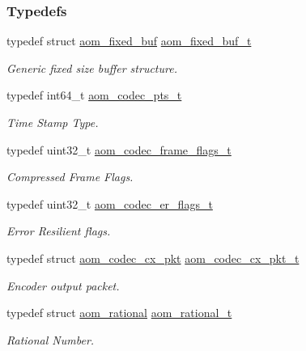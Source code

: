\subsubsection*{Typedefs}
\begin{DoxyCompactItemize}
\item 
typedef struct \hyperlink{structaom__fixed__buf}{aom\+\_\+fixed\+\_\+buf} \hyperlink{group__encoder_ga85cca9fad6bc25c667f013a39c607174}{aom\+\_\+fixed\+\_\+buf\+\_\+t}
\begin{DoxyCompactList}\small\item\em Generic fixed size buffer structure. \end{DoxyCompactList}\item 
typedef int64\+\_\+t \hyperlink{group__encoder_ga958524226c9a65251c9e4f7bb78fc606}{aom\+\_\+codec\+\_\+pts\+\_\+t}
\begin{DoxyCompactList}\small\item\em Time Stamp Type. \end{DoxyCompactList}\item 
typedef uint32\+\_\+t \hyperlink{group__encoder_gaf776d31e60e32bee1cdbaf052a8ea12a}{aom\+\_\+codec\+\_\+frame\+\_\+flags\+\_\+t}
\begin{DoxyCompactList}\small\item\em Compressed Frame Flags. \end{DoxyCompactList}\item 
typedef uint32\+\_\+t \hyperlink{group__encoder_ga5f326af84993f371bb165883bb5a5a59}{aom\+\_\+codec\+\_\+er\+\_\+flags\+\_\+t}
\begin{DoxyCompactList}\small\item\em Error Resilient flags. \end{DoxyCompactList}\item 
typedef struct \hyperlink{structaom__codec__cx__pkt}{aom\+\_\+codec\+\_\+cx\+\_\+pkt} \hyperlink{group__encoder_ga2373bdec1f53ddb0736c53a5ebce7b7b}{aom\+\_\+codec\+\_\+cx\+\_\+pkt\+\_\+t}
\begin{DoxyCompactList}\small\item\em Encoder output packet. \end{DoxyCompactList}\item 
typedef struct \hyperlink{structaom__rational}{aom\+\_\+rational} \hyperlink{group__encoder_ga89310b75f722a6f3ee5e88d9b0f5853f}{aom\+\_\+rational\+\_\+t}
\begin{DoxyCompactList}\small\item\em Rational Number. \end{DoxyCompactList}\item 

\end{DoxyCompactItemize}
